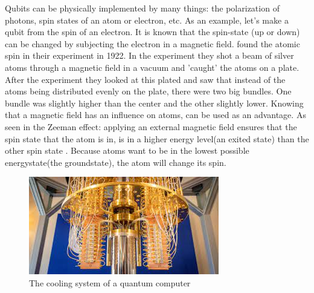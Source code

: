 Qubits can be physically implemented by many things: the polarization of photons, spin states of an atom or electron, etc. \autocite{thequbit}
As an example, let's make a qubit from the spin of an electron. It is known that the spin-state (up or down) can be changed by subjecting the electron in a magnetic field.
\textcite{Stern} found the atomic spin in their experiment in 1922. In the experiment they shot a beam of silver atoms through a magnetic field in a vacuum and 'caught' the atoms on a plate. After the experiment they looked at this plated and saw that instead of the atoms being distributed evenly on the plate, there were two big bundles.
One bundle was slightly higher than the center and the other slightly lower. Knowing that a magnetic field has an influence on atoms, can be used as an advantage. As seen in the Zeeman effect: applying an external magnetic field ensures that the spin state that the atom is in, is in a higher energy level(an exited state) than the other spin state \autocite{Zeeman}.
Because atoms want to be in the lowest possible energystate(the groundstate), the atom will change its spin. 

\begin{figure} [h]
    \centering
    \includegraphics[width=\textwidth]{img/qcomputer.jpg}
        \caption{The cooling system of a quantum computer \autocite{imgqcomp}}
        \label{fig:Quantum computer cooling}
\end{figure}

